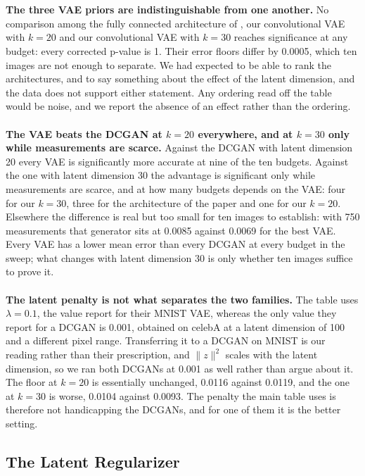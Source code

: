 \\\\
\textbf{The three VAE priors are indistinguishable from one another.} No comparison among the fully connected architecture of \cite{bora2017}, our convolutional VAE with \( k = 20 \) and our convolutional VAE with \( k = 30 \) reaches significance at any budget: every corrected p-value is 1. Their error floors differ by 0.0005, which ten images are not enough to separate. We had expected to be able to rank the architectures, and to say something about the effect of the latent dimension, and the data does not support either statement. Any ordering read off the table would be noise, and we report the absence of an effect rather than the ordering.
\\\\
\textbf{The VAE beats the DCGAN at \( k = 20 \) everywhere, and at \( k = 30 \) only while measurements are scarce.} Against the DCGAN with latent dimension 20 every VAE is significantly more accurate at nine of the ten budgets. Against the one with latent dimension 30 the advantage is significant only while measurements are scarce, and at how many budgets depends on the VAE: four for our \( k = 30 \), three for the architecture of the paper and one for our \( k = 20 \). Elsewhere the difference is real but too small for ten images to establish: with 750 measurements that generator sits at 0.0085 against 0.0069 for the best VAE. Every VAE has a lower mean error than every DCGAN at every budget in the sweep; what changes with latent dimension 30 is only whether ten images suffice to prove it.
\\\\
\textbf{The latent penalty is not what separates the two families.} The table uses \( \lambda = 0.1 \), the value \cite{bora2017} report for their MNIST VAE, whereas the only value they report for a DCGAN is 0.001, obtained on celebA at a latent dimension of 100 and a different pixel range. Transferring it to a DCGAN on MNIST is our reading rather than their prescription, and \( \|z\|^2 \) scales with the latent dimension, so we ran both DCGANs at 0.001 as well rather than argue about it. The floor at \( k = 20 \) is essentially unchanged, 0.0116 against 0.0119, and the one at \( k = 30 \) is worse, 0.0104 against 0.0093. The penalty the main table uses is therefore not handicapping the DCGANs, and for one of them it is the better setting.

\subsection{The Latent Regularizer}

